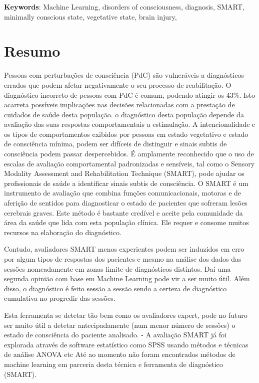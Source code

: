 \vspace*{10mm}\noindent
\textbf{Keywords}: Machine Learning, disorders of consciousness, diagnosis, SMART, minimally conscious state, vegetative state, brain injury,

\chapter*{Resumo}
Pessoas com perturbações de consciência (PdC) são vulneráveis a diagnósticos errados que podem afetar negativamente o seu processo de reabilitação. O diagnóstico incorreto de pessoas com PdC é comum, podendo atingir os 43\%. Isto acarreta possíveis implicações nas decisões relacionadas com a prestação de cuidados de saúde desta população. o diagnóstico desta população depende da avaliação das suas respostas comportamentais a estimulação. A intencionalidade e os tipos de comportamentos exibidos por pessoas em estado vegetativo e estado de consciência mínima, podem ser difíceis de distinguir e sinais subtis de consciência podem passar despercebidos. É amplamente reconhecido que o uso de escalas de avaliação comportamental padronizadas e sensíveis, tal como o Sensory Modality Assessment and Rehabilitation Technique (SMART), pode ajudar os profissionais de saúde a identificar sinais subtis de consciência. 
O SMART é um instrumento de avaliação que combina funções comunicacionais, motoras e de aferição de sentidos para diagnosticar o estado de pacientes que sofreram lesões cerebrais graves. Este método é bastante credível e aceite pela comunidade da área da saúde  que lida com esta população clínica. Ele requer e consome muitos recursos na elaboração do diagnóstico.

Contudo, avaliadores SMART menos experientes podem ser induzidos em erro por algum tipos de respostas dos pacientes e mesmo na análise dos dados das sessões nomeadamente em zonas limite de diagnósticos distintos. 
Daí uma segunda opinião com base em Machine Learning pode vir a ser muito útil. Além disso, o diagnóstico é feito sessão a sessão sendo a certeza de diagnóstico cumulativa no progredir das sessões.

Esta ferramenta se detetar tão bem como os avaliadores expert, pode no futuro ser muito útil a detetar antecipadamente (num menor número de sessões) o estado de consciência do paciente analisado.
- A avaliação SMART já foi explorada através de software estatístico como SPSS usando métodos e técnicas de análise ANOVA etc
Até ao momento  não foram encontrados  métodos de machine learning em parceria desta técnica e ferramenta de diagnóstico (SMART).  
 
